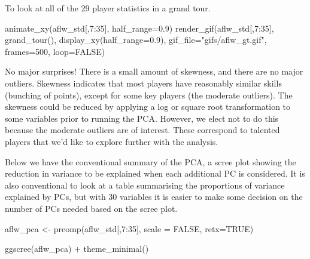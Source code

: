 \documentclass[
  letterpaper,
]{book}
\newenvironment{Shaded}{\begin{snugshade}}{\end{snugshade}}
\newcommand{\AttributeTok}[1]{\textcolor[rgb]{0.40,0.45,0.13}{#1}}
\newcommand{\ConstantTok}[1]{\textcolor[rgb]{0.56,0.35,0.01}{#1}}
\newcommand{\DecValTok}[1]{\textcolor[rgb]{0.68,0.00,0.00}{#1}}
\newcommand{\FloatTok}[1]{\textcolor[rgb]{0.68,0.00,0.00}{#1}}
\newcommand{\FunctionTok}[1]{\textcolor[rgb]{0.28,0.35,0.67}{#1}}
\newcommand{\NormalTok}[1]{\textcolor[rgb]{0.00,0.23,0.31}{#1}}
\newcommand{\OtherTok}[1]{\textcolor[rgb]{0.00,0.23,0.31}{#1}}
\newcommand{\SpecialCharTok}[1]{\textcolor[rgb]{0.37,0.37,0.37}{#1}}
\newcommand{\StringTok}[1]{\textcolor[rgb]{0.13,0.47,0.30}{#1}}
\begin{document}
To look at all of the 29 player statistics in a grand tour.

\begin{Shaded}
\begin{Highlighting}[]
\FunctionTok{animate\_xy}\NormalTok{(aflw\_std[,}\DecValTok{7}\SpecialCharTok{:}\DecValTok{35}\NormalTok{], }\AttributeTok{half\_range=}\FloatTok{0.9}\NormalTok{)}
\FunctionTok{render\_gif}\NormalTok{(aflw\_std[,}\DecValTok{7}\SpecialCharTok{:}\DecValTok{35}\NormalTok{], }
           \FunctionTok{grand\_tour}\NormalTok{(), }
           \FunctionTok{display\_xy}\NormalTok{(}\AttributeTok{half\_range=}\FloatTok{0.9}\NormalTok{),}
           \AttributeTok{gif\_file=}\StringTok{"gifs/aflw\_gt.gif"}\NormalTok{,}
           \AttributeTok{frames=}\DecValTok{500}\NormalTok{,}
           \AttributeTok{loop=}\ConstantTok{FALSE}\NormalTok{)}
\end{Highlighting}
\end{Shaded}

No major surprises! There is a small amount of skewness, and there are
no major outliers. Skewness indicates that most players have reasonably
similar skills (bunching of points), except for some key players (the
moderate outliers). The skewness could be reduced by applying a log or
square root transformation to some variables prior to running the PCA.
However, we elect not to do this because the moderate outliers are of
interest. These correspond to talented players that we'd like to explore
further with the analysis.

Below we have the conventional summary of the PCA, a scree plot showing
the reduction in variance to be explained when each additional PC is
considered. It is also conventional to look at a table summarising the
proportions of variance explained by PCs, but with 30 variables it is
easier to make some decision on the number of PCs needed based on the
scree plot.

\begin{Shaded}
\begin{Highlighting}[]
\NormalTok{aflw\_pca }\OtherTok{\textless{}{-}} \FunctionTok{prcomp}\NormalTok{(aflw\_std[,}\DecValTok{7}\SpecialCharTok{:}\DecValTok{35}\NormalTok{], }
               \AttributeTok{scale =} \ConstantTok{FALSE}\NormalTok{, }
               \AttributeTok{retx=}\ConstantTok{TRUE}\NormalTok{)}

\FunctionTok{ggscree}\NormalTok{(aflw\_pca) }\SpecialCharTok{+} \FunctionTok{theme\_minimal}\NormalTok{()}
\end{Highlighting}
\end{Shaded}
\end{document}
